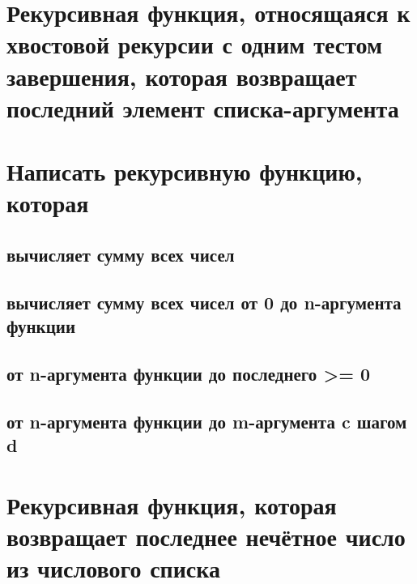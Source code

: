 


\section{Рекурсивная  функция, относящаяся к хвостовой рекурсии с одним тестом завершения, которая возвращает последний элемент списка-аргумента}




\section{Написать рекурсивную функцию, которая}

\subsection{вычисляет сумму всех чисел}


\subsection{вычисляет сумму всех чисел от 0 до n-аргумента функции}


\subsection{от n-аргумента функции до последнего >= 0}


\subsection{от n-аргумента функции до m-аргумента c шагом d}




\section{Рекурсивная функция, которая возвращает последнее нечётное число из числового списка}




